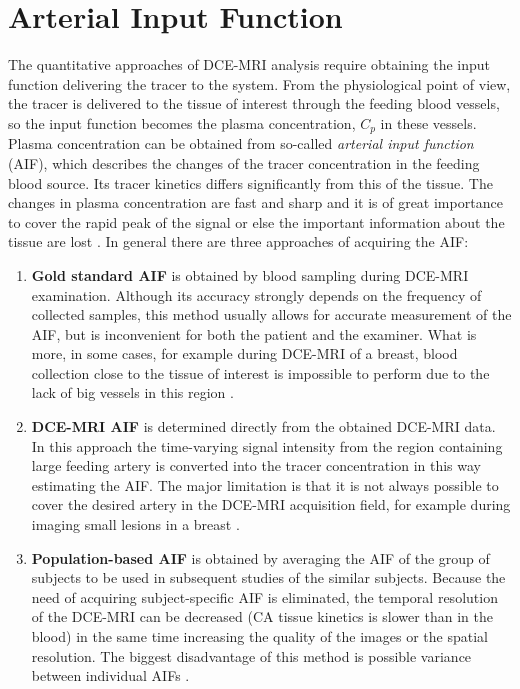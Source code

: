 \section{Arterial Input Function}
The quantitative approaches of DCE-MRI analysis require obtaining the input function delivering the tracer to the system. From the physiological point of view, the tracer is delivered to the tissue of interest through the feeding blood vessels, so the input function becomes the plasma concentration, $C_p$ in these vessels. Plasma concentration can be obtained from so-called \textit{arterial input function} (AIF), which describes the changes of the tracer concentration in the feeding blood source. Its tracer kinetics differs significantly from this of the tissue. The changes in plasma concentration are fast and sharp and it is of great importance to cover the rapid peak of the signal or else the important information about the tissue are lost \cite{khalifa2014models, jackson2005dynamic, barnes2012practical}.   
In general there are three approaches of acquiring the AIF:
\begin{enumerate}
\item{\textbf{Gold standard AIF}} is obtained by blood sampling during DCE-MRI examination.
Although its accuracy strongly depends on the frequency of collected samples, this method usually allows for accurate measurement of the AIF, but is inconvenient for both the patient and the examiner.
What is more, in some cases, for example during DCE-MRI of a breast, blood collection close to the tissue of interest is impossible to perform due to the lack of big vessels in this region \cite{khalifa2014models, barnes2012practical}. 
\item{\textbf{DCE-MRI AIF}} is determined directly from the obtained DCE-MRI data. In this approach the time-varying signal intensity from the region containing large feeding artery is converted into the tracer concentration in this way estimating the AIF. The major limitation is that it is not always possible to cover the desired artery in the DCE-MRI acquisition field, for example during imaging small lesions in a breast \cite{khalifa2014models}.   
\item{\textbf{Population-based AIF}} is obtained by averaging the AIF of the group of subjects to be used in subsequent studies of the similar subjects. Because the need of acquiring subject-specific AIF is eliminated, the temporal resolution of the DCE-MRI can be decreased (CA tissue kinetics is slower than in the blood) in the same time increasing the quality of the images or the spatial resolution. The biggest disadvantage of this method is possible variance between individual AIFs \cite{jackson2005dynamic}. 
\end{enumerate}



